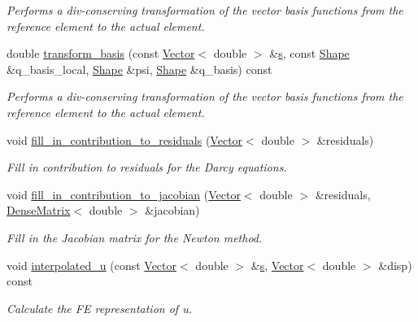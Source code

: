 \begin{DoxyCompactItemize}
\begin{DoxyCompactList}\small\item\em Performs a div-\/conserving transformation of the vector basis functions from the reference element to the actual element. \end{DoxyCompactList}\item 
double \hyperlink{classoomph_1_1PoroelasticityEquations_aef2c46b6662e90e0c09c8825281e4b9c}{transform\+\_\+basis} (const \hyperlink{classoomph_1_1Vector}{Vector}$<$ double $>$ \&\hyperlink{cfortran_8h_ab7123126e4885ef647dd9c6e3807a21c}{s}, const \hyperlink{classoomph_1_1Shape}{Shape} \&q\+\_\+basis\+\_\+local, \hyperlink{classoomph_1_1Shape}{Shape} \&psi, \hyperlink{classoomph_1_1Shape}{Shape} \&q\+\_\+basis) const
\begin{DoxyCompactList}\small\item\em Performs a div-\/conserving transformation of the vector basis functions from the reference element to the actual element. \end{DoxyCompactList}\item 
void \hyperlink{classoomph_1_1PoroelasticityEquations_a5f6d7585f4bb6c27c4cb4134fcf1f5a7}{fill\+\_\+in\+\_\+contribution\+\_\+to\+\_\+residuals} (\hyperlink{classoomph_1_1Vector}{Vector}$<$ double $>$ \&residuals)
\begin{DoxyCompactList}\small\item\em Fill in contribution to residuals for the Darcy equations. \end{DoxyCompactList}\item 
void \hyperlink{classoomph_1_1PoroelasticityEquations_a80054aa3b3eb9310430b2c50d45acdda}{fill\+\_\+in\+\_\+contribution\+\_\+to\+\_\+jacobian} (\hyperlink{classoomph_1_1Vector}{Vector}$<$ double $>$ \&residuals, \hyperlink{classoomph_1_1DenseMatrix}{Dense\+Matrix}$<$ double $>$ \&jacobian)
\begin{DoxyCompactList}\small\item\em Fill in the Jacobian matrix for the Newton method. \end{DoxyCompactList}\item 
void \hyperlink{classoomph_1_1PoroelasticityEquations_ae6557d385e674865e4a4c01d8a40b9b6}{interpolated\+\_\+u} (const \hyperlink{classoomph_1_1Vector}{Vector}$<$ double $>$ \&\hyperlink{cfortran_8h_ab7123126e4885ef647dd9c6e3807a21c}{s}, \hyperlink{classoomph_1_1Vector}{Vector}$<$ double $>$ \&disp) const
\begin{DoxyCompactList}\small\item\em Calculate the FE representation of u. \end{DoxyCompactList}\item 

\end{DoxyCompactItemize}
